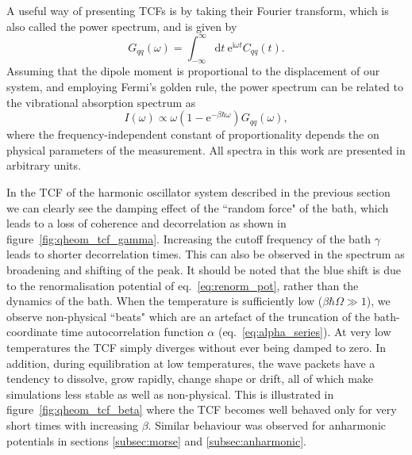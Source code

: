 A useful way of presenting TCFs is by taking their Fourier transform, which is also called the power spectrum, and is given by
\begin{equation}
	G_{qq}(\omega) = \int_{-\infty}^{\infty}\mathrm{d}t\ \mathrm{e}^{\mathrm{i}\omega t}C_{qq}(t).
\end{equation}
Assuming that the dipole moment is proportional to the displacement of our system, and employing Fermi's golden rule, the power spectrum can be related to the  vibrational absorption spectrum as\supercite{Zwanzig2001}
\begin{equation}
	I(\omega) \propto \omega (1-\mathrm{e}^{-\beta\hbar\omega})G_{qq}(\omega),
\end{equation}
where the frequency-independent constant of proportionality depends the on physical parameters of the measurement. All spectra in this work are presented in arbitrary units.

In the TCF of the harmonic oscillator system described in the previous section we can clearly see the damping effect of the ``random force" of the bath, which leads to a loss of coherence and decorrelation as shown in figure~\ref{fig:qheom_tcf_gamma}. Increasing the cutoff frequency of the bath $\gamma$ leads to shorter decorrelation times. This can also be observed in the spectrum as broadening and shifting of the peak. It should be noted that the blue shift is due to the renormalisation potential of eq.~\ref{eq:renorm_pot}, rather than the dynamics of the bath.
\newpage
When the temperature is sufficiently low ($\beta\hbar\Omega\gg1$), we observe non-physical ``beats" which are an artefact of the truncation of the bath-coordinate time autocorrelation function $\alpha$ (eq.~\ref{eq:alpha_series}). At very low temperatures the TCF simply diverges without ever being damped to zero. In addition, during equilibration at low temperatures, the wave packets have a tendency to dissolve, grow rapidly, change shape or drift, all of which make simulations less stable as well as non-physical. This is illustrated in figure~\ref{fig:qheom_tcf_beta} where the TCF becomes well behaved only for very short times with increasing $\beta$. Similar behaviour was observed for anharmonic potentials in sections \ref{subsec:morse} and \ref{subsec:anharmonic}.

